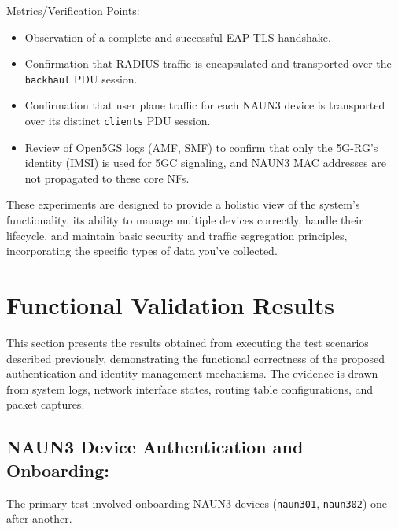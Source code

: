 Metrics/Verification Points:
\begin{itemize}
    \item Observation of a complete and successful \ac{EAP-TLS} handshake.
    \item Confirmation that \ac{RADIUS} traffic is encapsulated and transported over the \texttt{backhaul} \ac{PDU} session.
    \item Confirmation that user plane traffic for each \ac{NAUN3} device is transported over its distinct \texttt{clients} \ac{PDU} session.
    \item Review of Open5GS logs (\ac{AMF}, \ac{SMF}) to confirm that only the \ac{5G-RG}'s identity (\ac{IMSI}) is used for \ac{5GC} signaling, and \ac{NAUN3} \ac{MAC} addresses are not propagated to these core \acp{NF}.
\end{itemize}

These experiments are designed to provide a holistic view of the system's functionality, its ability to manage multiple devices correctly, handle their lifecycle, and maintain basic security and traffic segregation principles, incorporating the specific types of data you've collected.

\section{Functional Validation Results}

This section presents the results obtained from executing the test scenarios described previously, demonstrating the functional correctness of the proposed authentication and identity management mechanisms. The evidence is drawn from system logs, network interface states, routing table configurations, and packet captures.

\subsection{\acs{NAUN3} Device Authentication and Onboarding:}
The primary test involved onboarding \ac{NAUN3} devices (\texttt{naun301}, \texttt{naun302}) one after another.

